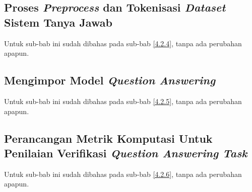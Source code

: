 \subsection{Proses \emph{Preprocess} dan Tokenisasi \emph{Dataset} Sistem Tanya Jawab}
\label{4.4.4}
Untuk sub-bab ini sudah dibahas pada sub-bab \ref{4.2.4}, tanpa ada perubahan apapun.

\subsection{Mengimpor Model \emph{Question Answering}}
\label{4.4.5}
Untuk sub-bab ini sudah dibahas pada sub-bab \ref{4.2.5}, tanpa ada perubahan apapun.

\subsection{Perancangan Metrik Komputasi Untuk Penilaian Verifikasi \emph{Question Answering Task}}
\label{4.4.6}
Untuk sub-bab ini sudah dibahas pada sub-bab \ref{4.2.6}, tanpa ada perubahan apapun.

